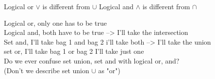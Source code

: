 \documentclass[11pt]{article}
\begin{document}
Logical or $\lor$ is different from $\cup$
Logical and $\land$ is different from $\cap$

Logical or, only one has to be true\\
Logical and, both have to be true --> I'll take the intersection\\

Set and, I'll take bag 1 and bag 2 i'll take both --> I'll take the union\\
set or, I'll take bag 1 or bag 2 I'll take just one\\

Do we ever confuse set union, set and with logical or, and?\\
(Don't we describe set union $\cup$ as "or")
\end{document}
